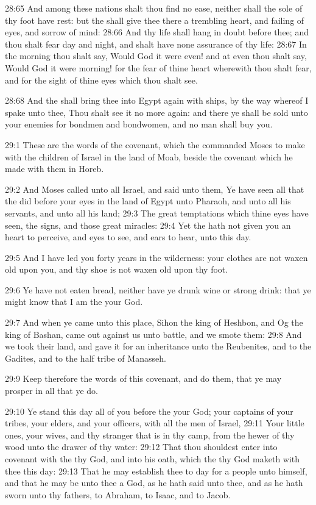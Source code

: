 28:65 And among these nations shalt thou find no ease, neither shall the sole of thy foot have rest: but the \LORD shall give thee there a trembling heart, and failing of eyes, and sorrow of mind: 28:66 And thy life shall hang in doubt before thee; and thou shalt fear day and night, and shalt have none assurance of thy life: 28:67 In the morning thou shalt say, Would God it were even! and at even thou shalt say, Would God it were morning! for the fear of thine heart wherewith thou shalt fear, and for the sight of thine eyes which thou shalt see.

28:68 And the \LORD shall bring thee into Egypt again with ships, by the way whereof I spake unto thee, Thou shalt see it no more again: and there ye shall be sold unto your enemies for bondmen and bondwomen, and no man shall buy you.

29:1 These are the words of the covenant, which the \LORD commanded Moses to make with the children of Israel in the land of Moab, beside the covenant which he made with them in Horeb.

29:2 And Moses called unto all Israel, and said unto them, Ye have seen all that the \LORD did before your eyes in the land of Egypt unto Pharaoh, and unto all his servants, and unto all his land; 29:3 The great temptations which thine eyes have seen, the signs, and those great miracles: 29:4 Yet the \LORD hath not given you an heart to perceive, and eyes to see, and ears to hear, unto this day.

29:5 And I have led you forty years in the wilderness: your clothes are not waxen old upon you, and thy shoe is not waxen old upon thy foot.

29:6 Ye have not eaten bread, neither have ye drunk wine or strong drink: that ye might know that I am the \LORD your God.

29:7 And when ye came unto this place, Sihon the king of Heshbon, and Og the king of Bashan, came out against us unto battle, and we smote them: 29:8 And we took their land, and gave it for an inheritance unto the Reubenites, and to the Gadites, and to the half tribe of Manasseh.

29:9 Keep therefore the words of this covenant, and do them, that ye may prosper in all that ye do.

29:10 Ye stand this day all of you before the \LORD your God; your captains of your tribes, your elders, and your officers, with all the men of Israel, 29:11 Your little ones, your wives, and thy stranger that is in thy camp, from the hewer of thy wood unto the drawer of thy water: 29:12 That thou shouldest enter into covenant with the \LORD thy God, and into his oath, which the \LORD thy God maketh with thee this day: 29:13 That he may establish thee to day for a people unto himself, and that he may be unto thee a God, as he hath said unto thee, and as he hath sworn unto thy fathers, to Abraham, to Isaac, and to Jacob.

